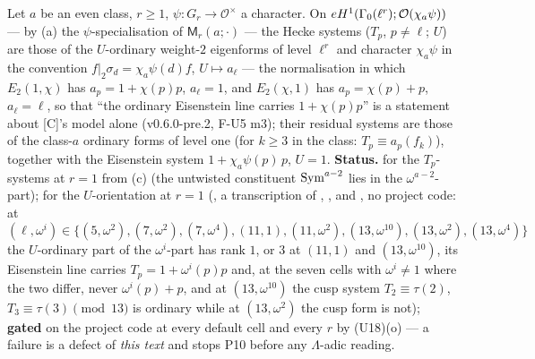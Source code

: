 \documentclass[11pt]{article}
\newcommand{\Iw}{\Lambda}                         %
\begin{document}
\begin{proposition}\label{prop:u-towerorient}
Let $a$ be an even class, $r\ge1$, $\psi\colon G_r\to\mathcal O^{\times}$ a character. On $e H^{1}(\Gamma_0(\ell^{r});\mathcal O(\chi_a\psi))$ --- by (a) the $\psi$-specialisation of
$\mathsf M_r(a;\cdot)$ --- the Hecke systems ($T_p$, $p\ne\ell$; $U$) are those of the $U$-ordinary weight-$2$ eigenforms of level $\ell^{r}$ and character $\chi_a\psi$ in the convention
$f|_2\sigma_d=\chi_a\psi(d)f$, $U\mapsto a_\ell$ --- the normalisation in which $E_2(1,\chi)$ has $a_p=1+\chi(p)p$, $a_\ell=1$, and $E_2(\chi,1)$ has $a_p=\chi(p)+p$, $a_\ell=\ell$, so that
``the ordinary Eisenstein line carries $1+\chi(p)p$'' is a statement about [C]'s model alone (v0.6.0-pre.2, F-U5 m3); their residual systems are those of the class-$a$ ordinary forms of level one (for $k\ge3$ in the class: $T_p\equiv a_p(f_k)$), together with
the Eisenstein system $1+\chi_a\psi(p)\,p$, $U=1$.
\textbf{Status.} \PROVED{} for the $T_p$-systems at $r=1$ from (c) (the untwisted constituent $\mathrm{Sym}^{a-2}$ lies in the $\omega^{a-2}$-part); \COMP{} for the $U$-orientation at $r=1$
(, a transcription of , ,  and , no project code: at
$(\ell,\omega^{i})\in\{(5,\omega^2),(7,\omega^2),(7,\omega^4),(11,1),(11,\omega^2),(13,\omega^{10}),(13,\omega^2),(13,\omega^4)\}$ the $U$-ordinary part of the $\omega^{i}$-part has rank $1$, or $3$ at
$(11,1)$ and $(13,\omega^{10})$, its Eisenstein line carries $T_p=1+\omega^{i}(p)p$ and, at the seven cells with $\omega^{i}\ne1$ where the two differ, never $\omega^{i}(p)+p$, and at $(13,\omega^{10})$ the cusp system $T_2\equiv\tau(2)$, $T_3\equiv\tau(3)\pmod{13}$
is ordinary while at $(13,\omega^{2})$ the cusp form is not); \textbf{gated} on the project code at every default cell and every $r$ by (U18)(o) --- a failure is a defect of \emph{this text}
and stops P10 before any $\Iw$-adic reading.
\end{proposition}
\end{document}
